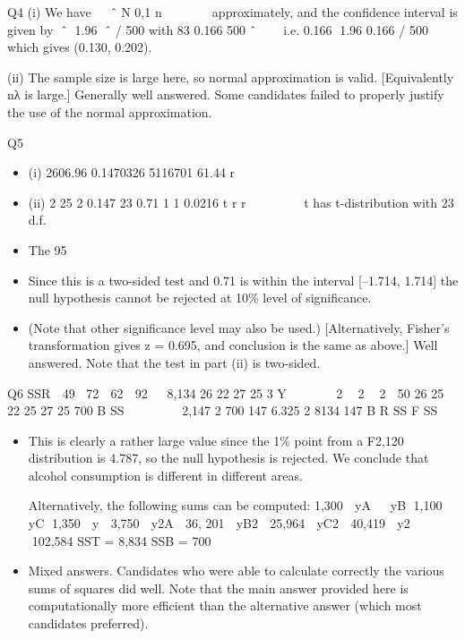 \documentclass[a4paper,12pt]{article}
\begin{document}
  Q4 (i) We have  
ˆ
N 0,1
n
  

 
approximately, and the confidence interval is
given by
ˆ 1.96 ˆ / 500 with 83 0.166
500
ˆ   
i.e. 0.166 1.96 0.166 / 500 which gives (0.130, 0.202).

(ii) The sample size is large here, so normal approximation is valid. [Equivalently nλ is large.]
Generally well answered. Some candidates failed to properly justify the use of the normal approximation.

Q5 

\begin{itemize}
\item (i) 2606.96 0.1470326
5116701 61.44
r 

\item (ii)
2
25 2 0.147 23 0.71
1 1 0.0216
t r
r
 
  
 
t has t-distribution with 23 d.f. 
\item The 95%
\item Since this is a two-sided test and 0.71 is within the interval [–1.714, 1.714] the null hypothesis cannot be rejected at 10\% level of significance.
\item (Note that other significance level may also be used.)
[Alternatively, Fisher’s transformation gives z = 0.695, and conclusion is the   same as above.]
Well answered. Note that the test in part (ii) is two-sided.
\end{itemize}

\newpage
Q6 SSR  49 72  62  92   8,134
26 22 27 25
3
Y  
 
 2  2  2  50 26 25 22 25 27 25 700 B SS       
2,147
2 700 147 6.325
2 8134
147
B
R
SS
F SS
  
\begin{itemize}
\item This is clearly a rather large value since the 1\% point from a F2,120 distribution is
4.787, so the null hypothesis is rejected. We conclude that alcohol consumption is different in different areas.
\item [Alternatively, the following sums can be computed:
    1,300  yA   yB 1,100  yC 1,350  y  3,750
   y2A  36, 201  yB2  25,964  yC2  40,419  y2 102,584
  SST = 8,834 SSB = 700 ]
\item Mixed answers. Candidates who were able to calculate correctly the various
sums of squares did well. Note that the main answer provided here is
computationally more efficient than the alternative answer (which most
                                                            candidates preferred).
                                                            \end{itemize}
\end{document}
